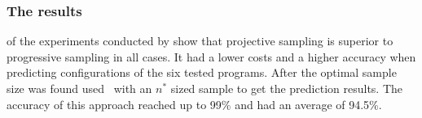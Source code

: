 \subsubsection[Results]{\textnormal{The results}} of the experiments conducted by \citet{CostEfficientSampling_Gou_Siegmund_2015} show that projective sampling is superior to progressive sampling in all cases. It had a lower costs and a higher accuracy when predicting configurations of the six tested programs. After the optimal sample size was found \citet{CostEfficientSampling_Gou_Siegmund_2015} used \VAPP~with an $n^*$ sized sample to get the prediction results. The accuracy of this approach reached up to 99\% and had an average of 94.5\%.